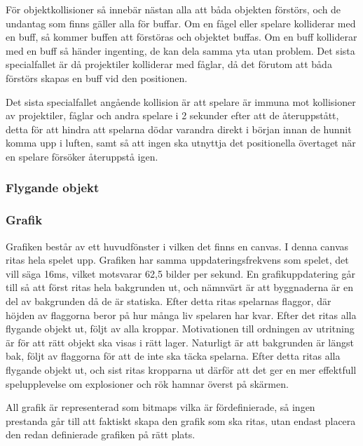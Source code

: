 \documentclass[12pt,a4paper]{article}
\begin{document}
För objektkollisioner så innebär nästan alla att båda objekten förstörs, och de undantag som finns gäller alla för buffar. Om en fågel eller spelare kolliderar med en buff, så kommer buffen att förstöras och objektet buffas. Om en buff kolliderar med en buff så händer ingenting, de kan dela samma yta utan problem. Det sista specialfallet är då projektiler kolliderar med fåglar, då det förutom att båda förstörs skapas en buff vid den positionen.

\vspace{0.2cm}

Det sista specialfallet angående kollision är att spelare är immuna mot kollisioner av projektiler, fåglar och andra spelare i 2 sekunder efter att de återuppstått, detta för att hindra att spelarna dödar varandra direkt i början innan de hunnit komma upp i luften, samt så att ingen ska utnyttja det positionella övertaget när en spelare försöker återuppstå igen.

\subsubsection{Flygande objekt}



\subsubsection{Grafik}
Grafiken består av ett huvudfönster i vilken det finns en canvas. I denna canvas ritas hela spelet upp. Grafiken har samma uppdateringsfrekvens som spelet, det vill säga 16ms, vilket motsvarar 62,5 bilder per sekund. En grafikuppdatering går till så att först ritas hela bakgrunden ut, och nämnvärt är att byggnaderna är en del av bakgrunden då de är statiska. Efter detta ritas spelarnas flaggor, där höjden av flaggorna beror på hur många liv spelaren har kvar. Efter det ritas alla flygande objekt ut, följt av alla kroppar. Motivationen till ordningen av utritning är för att rätt objekt ska visas i rätt lager. Naturligt är att bakgrunden är längst bak, följt av flaggorna för att de inte ska täcka spelarna. Efter detta ritas alla flygande objekt ut, och sist ritas kropparna ut därför att det ger en mer effektfull spelupplevelse om explosioner och rök hamnar överst på skärmen.

\vspace{0.2cm}

All grafik är representerad som bitmaps vilka är fördefinierade, så ingen prestanda går till att faktiskt skapa den grafik som ska ritas, utan endast placera den redan definierade grafiken på rätt plats.
\end{document}
